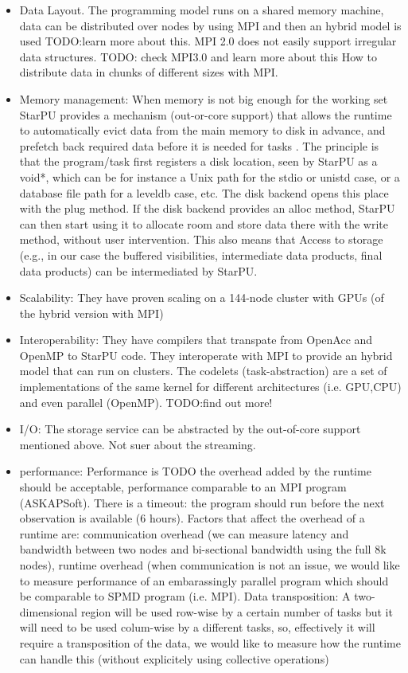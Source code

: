\begin{itemize}
\item Data Layout. The programming model runs on a shared memory machine, data can be distributed over nodes by using MPI and then an hybrid model is used TODO:learn more about this. MPI 2.0 does not easily support irregular data structures. TODO: check MPI3.0 and learn more about this How to distribute data in chunks of different sizes with MPI.
\item Memory management: When memory is not big enough for the working set StarPU provides a mechanism (out-or-core support) that allows the runtime to automatically evict data from the main memory to disk in advance, and prefetch back required data before it is needed for tasks . The principle is that the program/task first registers a disk location, seen by StarPU as a void*, which can be for instance a Unix path for the stdio or unistd case, or a database file path for a leveldb case, etc. The disk backend opens this place with the plug method.
If the disk backend provides an alloc method, StarPU can then start using it to allocate room and store data there with the write method, without user intervention. 
This also means that Access to storage (e.g., in our case the buffered visibilities, intermediate data products, final data products) can be intermediated by StarPU.
\item Scalability: They have proven scaling on a 144-node cluster with GPUs (of the hybrid version with MPI)
\item Interoperability: They have compilers that transpate from OpenAcc and OpenMP to StarPU code. They interoperate with MPI to provide an hybrid model that can run on clusters. 
The codelets (task-abstraction) are a set of implementations of the same kernel for different architectures (i.e. GPU,CPU) and even parallel (OpenMP). TODO:find out more!
\item I/O: The storage service can be abstracted by the out-of-core support mentioned above. Not suer about the streaming.
\item performance: Performance is TODO { the overhead added by the runtime should be acceptable, performance comparable to an MPI program (ASKAPSoft). There is a timeout: the program should run before the next observation is available (6 hours). Factors that affect the overhead of a runtime are: communication overhead (we can measure latency and bandwidth between two nodes and bi-sectional bandwidth using the full 8k nodes), runtime overhead (when communication is not an issue, we would like to measure performance of an embarassingly parallel program which should be comparable to SPMD program (i.e. MPI). Data transposition: A two-dimensional region will be used row-wise by a certain number of tasks but it will need to be used colum-wise by a different tasks, so, effectively it will require a transposition of the data, we would like to measure how the runtime can handle this (without explicitely using collective operations)} 

\end{itemize}
